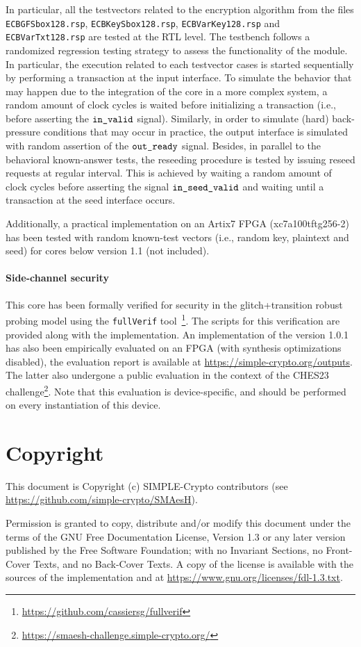 \documentclass{scrartcl}
\begin{document}
In particular, all the testvectors related to the
encryption algorithm from the files \texttt{ECBGFSbox128.rsp},
\texttt{ECBKeySbox128.rsp}, \texttt{ECBVarKey128.rsp} and
\texttt{ECBVarTxt128.rsp} are tested at the RTL level. The
testbench follows a randomized regression testing strategy to assess the
functionality of the module. In particular, the execution related to each
testvector cases is started sequentially by performing a transaction
at the input interface.  To simulate the behavior that may happen due to the
integration of the core in a more complex system, a random amount of clock
cycles is waited before initializing a transaction (i.e., before asserting the
$\texttt{in\_valid}$ signal). Similarly, in order to simulate (hard) back-pressure conditions that may occur
in practice, the output interface is simulated with random
assertion of the $\texttt{out\_ready}$ signal. Besides, in
parallel to the behavioral known-answer tests, the reseeding procedure is
tested by issuing reseed requests at regular interval. This is achieved by 
waiting a random amount of clock cycles before asserting the signal
$\texttt{in\_seed\_valid}$ and waiting until a transaction at the seed interface occurs.

Additionally, a practical implementation on an Artix7 FPGA (xc7a100tftg256-2)
has been tested with random known-test vectors (i.e., random key, plaintext and seed) for cores below version 1.1 (not included).  

\paragraph{Side-channel security}
This core has been formally verified for security in the glitch+transition
robust probing model using the \texttt{fullVerif}%
tool~\cite{DBLP:journals/tc/CassiersGLS21,DBLP:journals/tches/CassiersS21}\footnote{\url{https://github.com/cassiersg/fullverif}}.
The scripts for this verification are provided along with the implementation.
An implementation of the version 1.0.1 has also been empirically evaluated on
an FPGA (with synthesis optimizations disabled), the evaluation report is
available at \url{https://simple-crypto.org/outputs}. The latter also undergone
a public evaluation in the context of the CHES23
challenge\footnote{\url{https://smaesh-challenge.simple-crypto.org/}}. Note that this
evaluation is device-specific, and should be performed on every instantiation
of this device.

\section{Copyright}

This document is Copyright (c) SIMPLE-Crypto contributors (see \url{https://github.com/simple-crypto/SMAesH}).

Permission is granted to copy, distribute and/or modify this document under the
terms of the GNU Free Documentation License, Version 1.3 or any later version
published by the Free Software Foundation; with no Invariant Sections, no
Front-Cover Texts, and no Back-Cover Texts.
A copy of the license is available with the sources of the implementation and
at \url{https://www.gnu.org/licenses/fdl-1.3.txt}.



\end{document}
